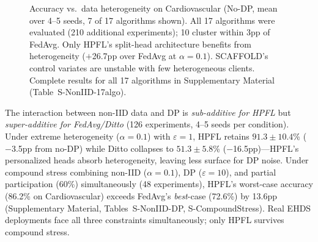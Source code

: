\documentclass[conference]{IEEEtran}
\begin{document}
\begin{figure}[htbp]
\centering
{}
\caption{Accuracy vs.\ data heterogeneity on Cardiovascular (No-DP, mean over 4--5 seeds, 7 of 17 algorithms shown). All 17 algorithms were evaluated (210 additional experiments); 10 cluster within 3pp of FedAvg. Only HPFL's split-head architecture benefits from heterogeneity ($+$26.7pp over FedAvg at $\alpha{=}0.1$). SCAFFOLD's control variates are unstable with few heterogeneous clients. Complete results for all 17 algorithms in Supplementary Material (Table~S-NonIID-17algo).}
\label{fig:noniid_impact}
\end{figure}

The interaction between non-IID data and DP is \textit{sub-additive for HPFL} but \textit{super-additive for FedAvg/Ditto} (126 experiments, 4--5 seeds per condition). Under extreme heterogeneity ($\alpha{=}0.1$) with $\varepsilon{=}1$, HPFL retains $91.3 \pm 10.4$\% ($-$3.5pp from no-DP) while Ditto collapses to $51.3 \pm 5.8$\% ($-$16.5pp)---HPFL's personalized heads absorb heterogeneity, leaving less surface for DP noise. Under compound stress combining non-IID ($\alpha{=}0.1$), DP ($\varepsilon{=}10$), and partial participation (60\%) simultaneously (48 experiments), HPFL's worst-case accuracy (86.2\% on Cardiovascular) exceeds FedAvg's \textit{best}-case (72.6\%) by 13.6pp (Supplementary Material, Tables~S-NonIID-DP, S-CompoundStress). Real EHDS deployments face all three constraints simultaneously; only HPFL survives compound stress.
\end{document}

